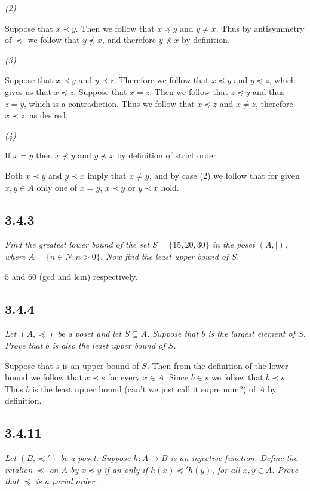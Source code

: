 \documentclass[11pt,oneside,titlepage]{book}
\begin{document}
\textit{(2)}

Suppose that $x \prec y$. Then we follow that $x \preceq y$ and $y \neq x$. Thus by antisymmetry
of $\preceq$ we follow that $y \not \preceq x$, and therefore $y \not \prec x$ by definition.

\textit{(3)}

Suppose that $x \prec y$ and $y \prec z$. Therefore we follow that $x \preceq y$ and $y \preceq z$,
which gives us that $x \preceq z$. Suppose that $x = z$. Then we follow that $z \preceq y$
and thus $z = y$, which is a contradiction. Thus we follow that $x \preceq z$ and $x \neq z$,
therefore $x \prec z$, as desired.

\textit{(4)}

If $x = y$ then $x \not \prec y$ and $y \not \prec x$ by definition of strict order

Both $x \prec y$ and $y \prec x$ imply that $x \neq y$, and by case (2) we follow that
for given $x, y \in A$ only one of $x = y$, $x \prec y$ or $y \prec x$ hold.

\subsection*{3.4.3}

\textit{Find the greatest lower bound of the set $S = \{15, 20, 30\}$ in the poset
  $(A, |)$, where $A = \{n \in N: n > 0\}$. Now find the least upper bound of $S$.}

$5$ and $60$ (gcd and lcm) respectively.

\subsection*{3.4.4}

\textit{Let $(A, \preceq)$ be a poset and let $S \subseteq A$. Suppose that $b$ is the
  largest element of $S$. Prove that $b$ is also the least upper bound of $S$.}

Suppose that $s$ is an upper bound of $S$. Then from the definition of the lower bound we
follow that $x \prec s$ for every $x \in A$. Since $b \in s$ we follow that $b \prec s$.
Thus $b$ is the least upper bound (can't we just call it supremum?) of $A$ by definition.

\subsection*{3.4.11}

\textit{Let $(B, \preceq')$ be a poset. Suppose $h: A \to B$ is an injective function.
  Define the retalion $\preceq$ on $A$ by $x \preceq y$ if an only if $h(x) \preceq' h(y)$,
  for all $x, y \in A$. Prove that $\preceq$ is a parial order.}
\end{document}
